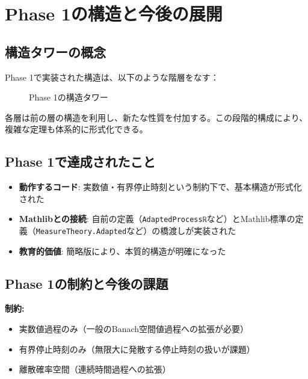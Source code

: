 \documentclass[a4paper,11pt]{ltjsarticle}
\theoremstyle{definition}
\begin{document}
\section{Phase 1の構造と今後の展開}

\subsection{構造タワーの概念}

Phase 1で実装された構造は、以下のような階層をなす：

\begin{figure}[h]
\centering
{}
\caption{Phase 1の構造タワー}
\label{fig:structure_tower}
\end{figure}

各層は前の層の構造を利用し、新たな性質を付加する。この段階的構成により、複雑な定理も体系的に形式化できる。

\subsection{Phase 1で達成されたこと}

\begin{itemize}
  \item \textbf{動作するコード}: 実数値・有界停止時刻という制約下で、基本構造が形式化された
  \item \textbf{Mathlibとの接続}: 自前の定義（\texttt{AdaptedProcessℝ}など）とMathlib標準の定義（\texttt{MeasureTheory.Adapted}など）の橋渡しが実装された
  \item \textbf{教育的価値}: 簡略版により、本質的構造が明確になった
\end{itemize}

\subsection{Phase 1の制約と今後の課題}

\textbf{制約:}
\begin{itemize}
  \item 実数値過程のみ（一般のBanach空間値過程への拡張が必要）
  \item 有界停止時刻のみ（無限大に発散する停止時刻の扱いが課題）
  \item 離散確率空間（連続時間過程への拡張）
\end{itemize}
\end{document}
